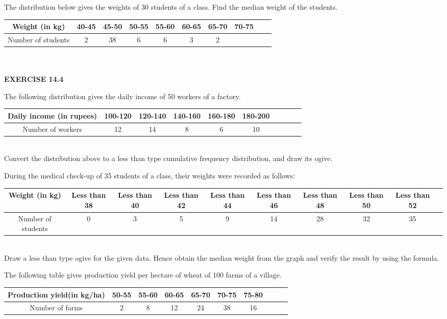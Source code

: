 \item The distribution below gives the weights of 30 students of a class. Find the median
weight of the students.
\begin{tabular}{|c|c|c|c|c|c|c|c|c|c|}
\hline
Weight (in kg)&40-45&45-50&50-55&55-60&60-65&65-70&70-75\\
\hline
Number of students&2&38&6&6&3&2\\
\hline
\end{tabular}\\\\
{\Large \textbf{EXERCISE 14.4}}
\item The following distribution gives the daily income of 50 workers of a factory.
\begin{tabular}{|c|c|c|c|c|c|c|c|c|c|}
\hline
Daily income (in rupees)&100-120&120-140&140-160&160-180&180-200\\
\hline
Number of workers&12&14&8&6&10\\
\hline
\end{tabular}\\
Convert the distribution above to a less than type cumulative frequency distribution,
and draw its ogive.
\item During the medical check-up of 35 students of a class, their weights were recorded as
follows:
\begin{tabular}{|c|c|c|c|c|c|c|c|c|c|}
\hline
Weight (in kg)&Less than 38&Less than 40&Less than 42&Less than 44&Less than 46&Less than 48& Less than 50&Less than 52\\
\hline
Number of students&0&3&5&9&14&28&32&35\\
\hline
\end{tabular}\\
Draw a less than type ogive for the given data. Hence obtain the median weight from
the graph and verify the result by using the formula.
\item The following table gives production yield per hectare of wheat of 100 farms of a village.
\begin{tabular}{|c|c|c|c|c|c|c|c|c|c|}
\hline
Production yield(in kg/ha)&50-55&55-60&60-65&65-70&70-75&75-80
\\
\hline
Number of farms&2&8&12&24&38&16\\
\hline
\end{tabular}\\
        
